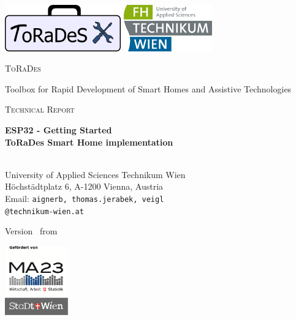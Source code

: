 \documentclass[]{scrreprt}%
\newcommand{\docTitle}{ESP32 - Getting Started\\ToRaDes Smart Home implementation}
\newcommand{\BAEmail}{aignerb}
\newcommand{\CVEmail}{veigl}
\newcommand{\TJEmail}{thomas.jerabek}
\begin{document}
% 
% 
% 

\begin{titlepage}
	
	\includegraphics[height=20mm]{logo.png} \hfill
	\includegraphics[height=20mm]{fhtw.png}
	
	\centering
	\par\vspace{1cm}
	{\scshape\Huge ToRaDes \normalsize \par Toolbox for Rapid Development of Smart Homes and Assistive Technologies \par}
	\vspace{1cm}
	{\scshape\Large Technical Report\par}
	\vspace{1.5cm}
	{\huge\bfseries \docTitle \par}
	\vspace{2cm}
	{\Large
	\vhListAllAuthorsLongWithAbbrev \\{University of Applied Sciences Technikum Wien}
	\\{H\"ochst\"adtplatz 6, A-1200 Vienna, Austria}
	\\{Email: {\texttt{\BAEmail, \TJEmail, \CVEmail}}}
	\\{\texttt{@technikum-wien.at}}
	\par}
	\vfill
	{\large Version \vhCurrentVersion\ from \vhCurrentDate \par}
	\begin{flushright}
	 \includegraphics[height=30mm]{ma23.png}
	\end{flushright}
\end{titlepage}
\end{document}
